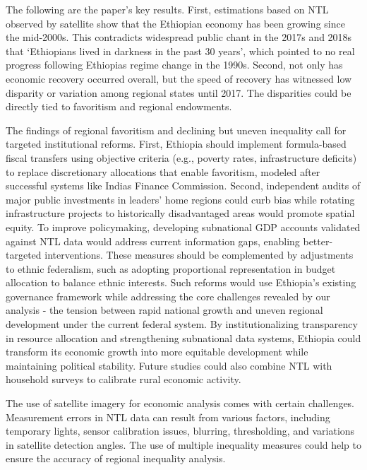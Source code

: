 The following are the paper's key results. First, estimations based on
NTL observed by satellite show that the Ethiopian economy has been
growing since the mid-2000s. This contradicts widespread public chant in
the 2017s and 2018s that `Ethiopians lived in darkness in the past 30
years', which pointed to no real progress following
Ethiopia\textquotesingle s regime change in the 1990s. Second, not only
has economic recovery occurred overall, but the speed of recovery has
witnessed low disparity or variation among regional states until 2017.
The disparities could be directly tied to favoritism and regional
endowments.

The findings of regional favoritism and declining but uneven inequality
call for targeted institutional reforms. First, Ethiopia should
implement formula-based fiscal transfers using objective criteria (e.g.,
poverty rates, infrastructure deficits) to replace discretionary
allocations that enable favoritism, modeled after successful systems
like India\textquotesingle s Finance Commission. Second, independent
audits of major public investments in leaders' home regions could curb
bias while rotating infrastructure projects to historically
disadvantaged areas would promote spatial equity. To improve
policymaking, developing subnational GDP accounts validated against NTL
data would address current information gaps, enabling better-targeted
interventions. These measures should be complemented by adjustments to
ethnic federalism, such as adopting proportional representation in
budget allocation to balance ethnic interests. Such reforms would use
Ethiopia's existing governance framework while addressing the core
challenges revealed by our analysis - the tension between rapid national
growth and uneven regional development under the current federal system.
By institutionalizing transparency in resource allocation and
strengthening subnational data systems, Ethiopia could transform its
economic growth into more equitable development while maintaining
political stability. Future studies could also combine NTL with
household surveys to calibrate rural economic activity.

The use of satellite imagery for economic analysis comes with certain
challenges. Measurement errors in NTL data can result from various
factors, including temporary lights, sensor calibration issues,
blurring, thresholding, and variations in satellite detection angles.
The use of multiple inequality measures could help to ensure the
accuracy of regional inequality analysis.

